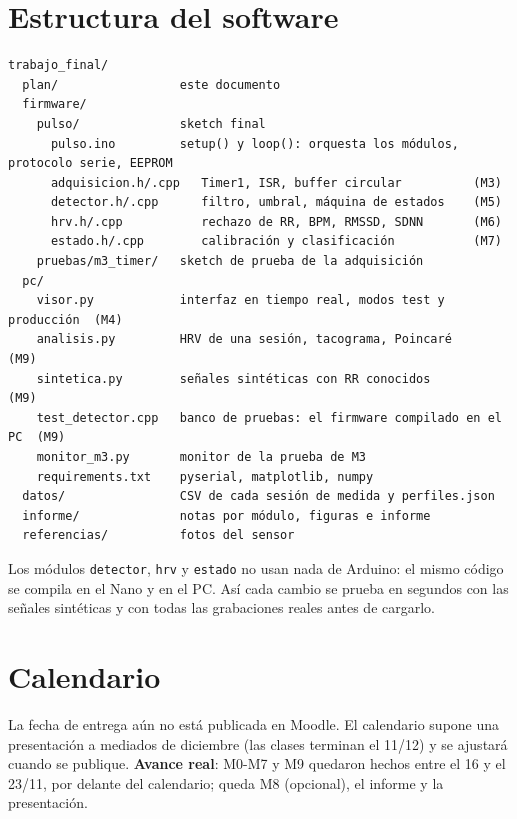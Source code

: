 \documentclass[11pt,a4paper]{article}
\begin{document}
\section{Estructura del software}

\begin{lstlisting}[language={}]
trabajo_final/
  plan/                 este documento
  firmware/
    pulso/              sketch final
      pulso.ino         setup() y loop(): orquesta los módulos, protocolo serie, EEPROM
      adquisicion.h/.cpp   Timer1, ISR, buffer circular          (M3)
      detector.h/.cpp      filtro, umbral, máquina de estados    (M5)
      hrv.h/.cpp           rechazo de RR, BPM, RMSSD, SDNN       (M6)
      estado.h/.cpp        calibración y clasificación           (M7)
    pruebas/m3_timer/   sketch de prueba de la adquisición
  pc/
    visor.py            interfaz en tiempo real, modos test y producción  (M4)
    analisis.py         HRV de una sesión, tacograma, Poincaré            (M9)
    sintetica.py        señales sintéticas con RR conocidos               (M9)
    test_detector.cpp   banco de pruebas: el firmware compilado en el PC  (M9)
    monitor_m3.py       monitor de la prueba de M3
    requirements.txt    pyserial, matplotlib, numpy
  datos/                CSV de cada sesión de medida y perfiles.json
  informe/              notas por módulo, figuras e informe
  referencias/          fotos del sensor
\end{lstlisting}

Los módulos \texttt{detector}, \texttt{hrv} y \texttt{estado} no usan nada de Arduino: el
mismo código se compila en el Nano y en el PC. Así cada cambio se prueba en segundos con las
señales sintéticas y con todas las grabaciones reales antes de cargarlo.

\section{Calendario}

La fecha de entrega aún no está publicada en Moodle. El calendario supone una presentación a
mediados de diciembre (las clases terminan el 11/12) y se ajustará cuando se publique.
\textbf{Avance real}: M0-M7 y M9 quedaron hechos entre el 16 y el 23/11, por delante del
calendario; queda M8 (opcional), el informe y la presentación.
\end{document}

